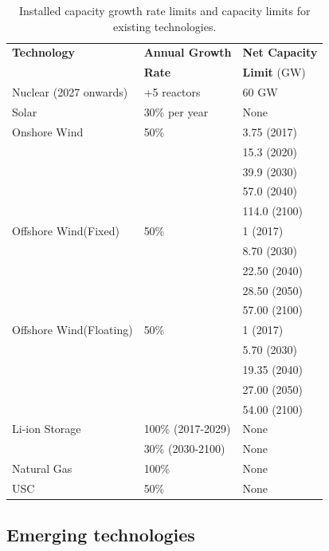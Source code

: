 \begin{table}[!ht]
	\caption{Installed capacity growth rate limits and capacity limits for existing technologies.}
	\vspace{0.1in}
	\begin{tabularx}{\textwidth}{p{} p{} p{} }
		\hline
\textbf{Technology} & \textbf{Annual Growth} & \textbf{Net Capacity} \\
  & \textbf{Rate}  & \textbf{Limit} (GW) \\
\hline
Nuclear (2027 onwards) & +5 reactors & 60 GW \\
Solar & 30\% per year & None  \\
Onshore Wind & 50\% & 3.75 (2017) \\
 &  & 15.3 (2020) \\
 &  & 39.9 (2030) \\
 &  & 57.0 (2040) \\
 &  & 114.0 (2100) \\
Offshore Wind(Fixed) & 50\% & 1 (2017) \\
 &  & 8.70 (2030) \\
 &  & 22.50 (2040) \\
 &  & 28.50 (2050) \\
 &  & 57.00 (2100) \\
Offshore Wind(Floating) & 50\% & 1 (2017) \\
 &  & 5.70 (2030) \\
 &  & 19.35 (2040) \\
 &  & 27.00 (2050) \\
 &  & 54.00 (2100) \\
Li-ion Storage & 100\% (2017-2029) & None  \\
 & 30\% (2030-2100) & None  \\
Natural Gas &  100\% & None \\
\gls{USC} & 50\% & None \\
\hline 
\end{tabularx}
\label{existing-gro}
\end{table}


\subsection{Emerging technologies}

